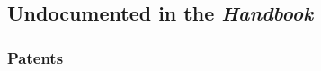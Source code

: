 \documentclass{ltxdockit}
\begin{document}
\subsection{Undocumented in the \emph{Handbook}} %
\label{sub:undocumented_in_the_emph_handbook}
\subsubsection{Patents} %
\label{ssub:patents}
\begin{refsection}
	\printbibliography[heading=none]
\end{refsection}


\end{document}
